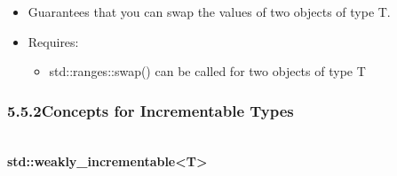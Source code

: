 \begin{itemize}
\item
Guarantees that you can swap the values of two objects of type T.

\item
Requires:
\begin{itemize}
\item
std::ranges::swap() can be called for two objects of type T
\end{itemize}
\end{itemize}


\subsubsection*{ 5.5.2\hspace{0.2cm}Concepts for Incrementable Types}


\noindent
\hspace*{\fill} \\ %
\textbf{std::weakly\_incrementable<T>}

